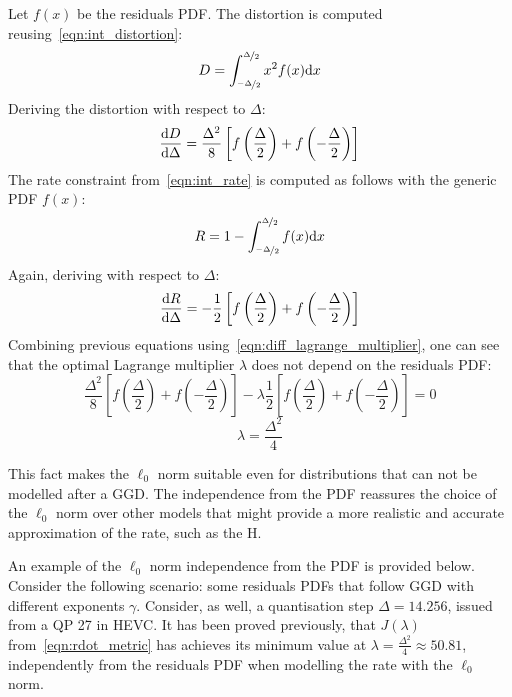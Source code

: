 \documentclass[11pt,a4paper,openright,twoside]{book}
\numberwithin{equation}{section} %
\begin{document}
Let $f(x)$ be the residuals \ac{PDF}.
The distortion is computed reusing~\eqref{eqn:int_distortion}:
\begin{equation}
	D = \int_{\nicefrac{-\Delta}{2}}^{\nicefrac{\Delta}{2}} x^2 f(x) \text{d} x
\end{equation}
Deriving the distortion with respect to $\Delta$:
\begin{equation}
	\frac{\text{d} D}{\text{d} \Delta} =
	\frac{\Delta^2}{8}\left[
	f\left(\frac{\Delta}{2}\right)+f\left(-\frac{\Delta}{2}\right)\right]
\end{equation}
The rate constraint from~\eqref{eqn:int_rate} is computed as
follows with the generic \ac{PDF}
$f(x)$:
\begin{equation}
	R = 1 - \int_{\nicefrac{-\Delta}{2}}^{\nicefrac{\Delta}{2}} f(x) \text{d} x\\
\end{equation}
Again, deriving with respect to $\Delta$:
\begin{equation}
	\frac{\text{d} R}{\text{d} \Delta} =
	-\frac{1}{2}\left[
	f\left(\frac{\Delta}{2}\right)+
	f\left(-\frac{\Delta}{2}\right)\right]
\end{equation}
Combining previous equations using~\eqref{eqn:diff_lagrange_multiplier},
one can see that the optimal Lagrange multiplier $\lambda$ does not
depend on the residuals \ac{PDF}:
\begin{equation}
	\frac{\Delta^2}{8}\left[
	f\left(\frac{\Delta}{2}\right)+f\left(-\frac{\Delta}{2}\right)\right]
	- \lambda
	\frac{1}{2}\left[
	f\left(\frac{\Delta}{2}\right)+
	f\left(-\frac{\Delta}{2}\right)\right] = 0
\end{equation}
\begin{equation}
	\boxed{\lambda = \frac{\Delta^2}{4}}
\end{equation}

This fact makes the $\ell_0$ norm suitable even for distributions
that can not be modelled after a \ac{GGD}.
The independence from the \ac{PDF} reassures the choice of the $\ell_0$
norm over other models that might provide a more realistic and accurate
approximation of the rate, such as the \ac{H}.

An example of the $\ell_0$ norm independence from the \ac{PDF} is provided
below.
Consider the following scenario: some residuals \acp{PDF} that follow
\ac{GGD} with different exponents $\gamma$.
Consider, as well, a quantisation step $\Delta=14.256$, issued from a
\ac{QP} 27 in \ac{HEVC}.
It has been proved previously, that $J(\lambda)$
from~\eqref{eqn:rdot_metric} has achieves its minimum value at
$\lambda=\frac{\Delta^2}{4}\approx50.81$, independently from the
residuals \ac{PDF} when modelling the rate with the $\ell_0$ norm.
\end{document}
